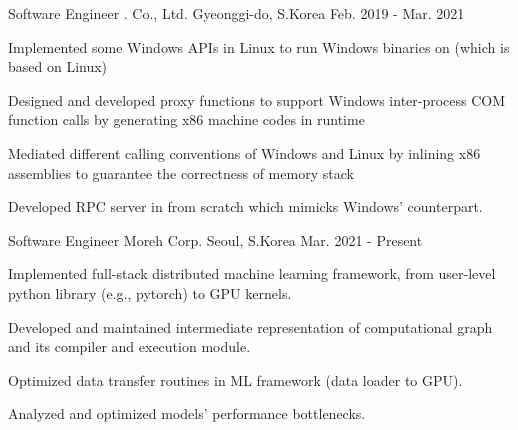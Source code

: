 

\begin{cventries}

  \cventry
    {Software Engineer} %
    {\mycompany{}. Co., Ltd.} %
    {Gyeonggi-do, S.Korea} %
    {Feb. 2019 - Mar. 2021} %
    {
      \begin{cvitems} %
        \item {Implemented some Windows APIs in Linux to run Windows binaries on \mycompany{} (which is based on Linux)}
	\item {Designed and developed proxy functions to support Windows inter-process COM function calls by generating x86 machine codes in runtime}
	\item {Mediated different calling conventions of Windows and Linux by inlining x86 assemblies to guarantee the correctness of memory stack}
	\item {Developed RPC server in \mycompany{} from scratch which mimicks Windows' counterpart.}  
      \end{cvitems}
    }

  \cventry
    {Software Engineer} %
    {Moreh Corp.} %
    {Seoul, S.Korea} %
    {Mar. 2021 - Present} %
    {
      \begin{cvitems} %
        \item {Implemented full-stack distributed machine learning framework, from user-level python library (e.g., pytorch) to GPU kernels.}
        \item {Developed and maintained intermediate representation of computational graph and its compiler and execution module.}
	\item {Optimized data transfer routines in ML framework (data loader to GPU).}
        \item {Analyzed and optimized models' performance bottlenecks.}
      \end{cvitems}
    }

\end{cventries}